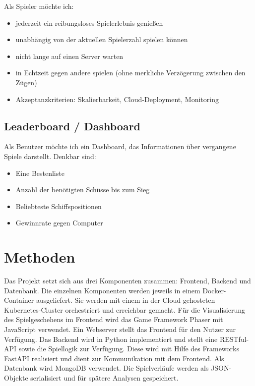 \documentclass[a4paper, 10pt, conference]{IEEEtran}
\begin{document}
Als Spieler möchte ich:
\begin{itemize}
	\item jederzeit ein reibungsloses Spielerlebnis genießen
	\item unabhängig von der aktuellen Spielerzahl spielen können
	\item nicht lange auf einen Server warten
	\item in Echtzeit gegen andere spielen (ohne merkliche Verzögerung zwischen den Zügen)
	\item Akzeptanzkriterien: Skalierbarkeit, Cloud-Deployment, Monitoring
\end{itemize}

\subsection{Leaderboard / Dashboard}
Als Benutzer möchte ich ein Dashboard, das Informationen über vergangene Spiele darstellt. Denkbar sind:
\begin{itemize}
	\item Eine Bestenliste
	\item Anzahl der benötigten Schüsse bis zum Sieg
	\item Beliebteste Schiffspositionen
	\item Gewinnrate gegen Computer
\end{itemize}


\section{Methoden}\label{sec:methoden}

Das Projekt setzt sich aus drei Komponenten zusammen: Frontend, Backend und Datenbank.
Die einzelnen Komponenten werden jeweils in einem Docker-Container ausgeliefert.
Sie werden mit einem in der Cloud gehosteten Kubernetes-Cluster orchestriert und erreichbar gemacht.
Für die Visualisierung des Spielgeschehens im Frontend wird das Game Framework Phaser mit JavaScript verwendet. 
Ein Webserver stellt das Frontend für den Nutzer zur Verfügung.
Das Backend wird in Python implementiert und stellt eine RESTful-API sowie die Spiellogik zur Verfügung.
Diese wird mit Hilfe des Frameworks FastAPI realisiert und dient zur Kommunikation mit dem Frontend.
Als Datenbank wird MongoDB verwendet. Die Spielverläufe werden als JSON-Objekte serialisiert und für spätere Analysen gespeichert.

\printbibliography
\end{document}
